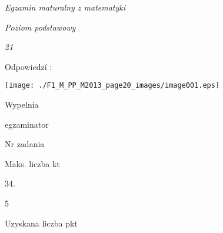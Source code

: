 \documentclass[a4paper,12pt]{article}
\begin{document}
{\it Egzamin maturalny z matematyki}

{\it Poziom podstawowy}

{\it 21}

Odpowiedzí :
\begin{center}
\texttt{[image: ./F1\_M\_PP\_M2013\_page20\_images/image001.eps]}
\end{center}
Wypelnia

egzaminator

Nr zadania

Maks. liczba kt

34.

5

Uzyskana liczba pkt
\end{document}
